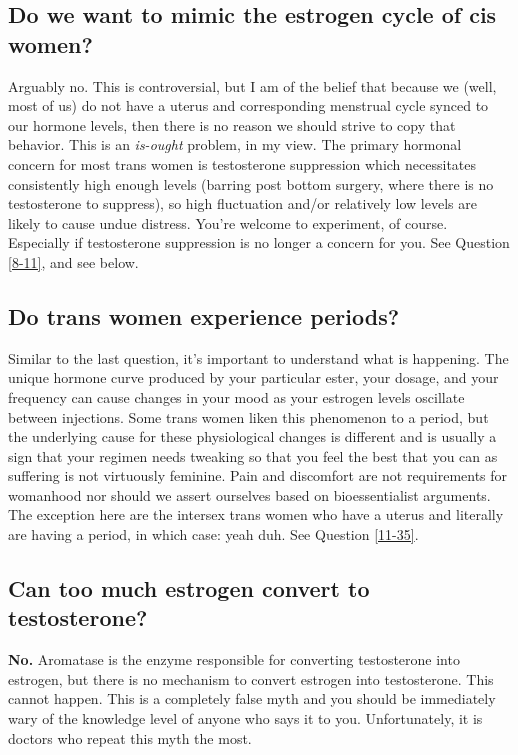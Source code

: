 \documentclass{article}
\begin{document}
\subsection{Do we want to mimic the estrogen cycle of cis women?}\label{11-10}

Arguably no. This is controversial, but I am of the belief that because we (well, most of us) do not have a uterus and corresponding menstrual cycle synced to our hormone levels, then there is no reason we should strive to copy that behavior. This is an \textit{is-ought} problem, in my view. The primary hormonal concern for most trans women is testosterone suppression which necessitates consistently high enough levels (barring post bottom surgery, where there is no testosterone to suppress), so high fluctuation and/or relatively low levels are likely to cause undue distress. You’re welcome to experiment, of course. Especially if testosterone suppression is no longer a concern for you. See Question \ref{8-11}, and see below.

\subsection{Do trans women experience periods?}

Similar to the last question, it’s important to understand what is happening. The unique hormone curve produced by your particular ester, your dosage, and your frequency can cause changes in your mood as your estrogen levels oscillate between injections. Some trans women liken this phenomenon to a period, but the underlying cause for these physiological changes is different and is usually a sign that your regimen needs tweaking so that you feel the best that you can as suffering is not virtuously feminine. Pain and discomfort are not requirements for womanhood nor should we assert ourselves based on bioessentialist arguments. The exception here are the intersex trans women who have a uterus and literally are having a period, in which case: yeah duh. See Question \ref{11-35}.

\subsection{Can too much estrogen convert to testosterone?}

\textbf{No.} Aromatase is the enzyme responsible for converting testosterone into estrogen, but there is no mechanism to convert estrogen into testosterone. This cannot happen. This is a completely false myth and you should be immediately wary of the knowledge level of anyone who says it to you. Unfortunately, it is doctors who repeat this myth the most.
\end{document}
